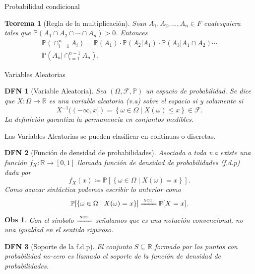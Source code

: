 \documentclass[a4paper]{article}
\newtheorem{definition}{DFN}
\theoremstyle{mytheoremstyle}
\newtheorem{theorem}{Teorema}
\newtheorem*{obs}{Obs}
\newcommand{\IP}{\mathbb{P}}
\newcommand{\R}{\mathbb{R}}
\newcommand{\F}{\mathcal{F}}
\newcommand{\1}{\mathds{1}}
\providecommand{\set}[1]{\left\{#1\right\}}
\begin{document}
\begin{multicols*}{3}
\begin{roundbox}{Probabilidad condicional}
    \begin{theorem}[Regla de la multiplicación]
        Sean $A_1, A_2, \dots, A_n \in F$ cualesquiera tales que $\IP(A_1 \cap A_2 \cap \cdots \cap A_n) >0$. Entonces
        \begin{equation*}
            \begin{split}
                \IP(\cap_{i=1}^{n} A_i) = \IP(A_1) \cdot \IP(A_2|A_1) \cdot \IP(A_3|A_1 \cap A_2) \cdots \\ \IP(A_n | \cap_{i=1}^{n-1}A_n).  
            \end{split}
        \end{equation*}
    \end{theorem}
\end{roundbox}

\begin{roundbox}{Variables Aleatorias}
    \begin{definition}[Variable Aleatoria] 
        Sea $(\Omega, \F, \IP)$ un espacio de probabilidad. Se dice que $X:\Omega \to \R$ es una variable aleatoria (v.a) sobre el espacio si y solamente si 
        \[
            X^{-1}((-\infty, x]) = \set{\omega \in \Omega \mid X(\omega) \leq x} \in \F.  
        \]
        La definición garantiza la permanencia en conjuntos medibles. 
    \end{definition}

    Las Variables Aleatorias se pueden clasificar en contínuas o discretas.

    \begin{definition}[Función de densidad de probabilidades] 
        Asociada a toda v.a existe una función $f_{X} : \R \to [0,1]$ llamada función de densidad de probabilidades (f.d.p) dada por
        \[
            f_{X} (x) \coloneqq \IP[\set{\omega \in \Omega \mid X(\omega) = x}] .
        \] 
        Como \textit{azucar sintáctica} podemos escribir lo anterior como
        \[
            \IP[\set{\omega \in \Omega \mid X(\omega) = x}] \xlongequal{\text{\scshape not.}} \IP[X = x].
        \]
    \end{definition}

    \begin{obs}
        Con el símbolo $\xlongequal{\text{\scshape not.}}$ señalamos que es una notación convencional, no una igualdad en el sentido riguroso. 
    \end{obs}

    \begin{definition}[Soporte de la f.d.p] 
        El conjunto $S \subseteq \R$ formado por los puntos con probabilidad no-cero es llamado el soporte de la función de densidad de probabilidades.  
    \end{definition}
\end{roundbox}


\end{multicols*}
\end{document}
